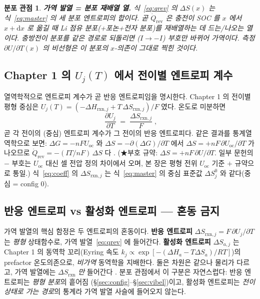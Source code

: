\documentclass[11pt,a4paper]{article}
\newtheorem*{distbox}{분포 관점}
\newcommand{\dd}{\mathrm{d}}
\newcommand{\rxn}{\mathrm{rxn}}
\newcommand{\rev}{\mathrm{rev}}
\newcommand{\oc}{\mathrm{oc}}
\begin{document}
\begin{distbox}
\textbf{가역 발열 = 분포 재배열 열.} 식~\eqref{eq:qrev} 의 $\Delta S(x)$ 는 식~\eqref{eq:master} 의
세 분포 엔트로피의 합이다. 곧 $\dot Q_\rev$ 은 충전이 SOC 를 $x$ 에서 $x+\dd x$ 로 옮길 때 Li 점유
분포(+포논+전자 분포)를 \emph{재배열하는 데 드는/나오는 열}이다. 충방전이 분포를 같은 경로로 되돌리면
($I\to-I$) 부호만 바뀌어 \emph{가역}이다. 측정 $\partial U/\partial T(x)$ 의 비선형은 이 분포의
$x$-의존이 그대로 찍힌 것이다.
\end{distbox}

\subsection{Chapter 1 의 $U_j(T)$ 에서 전이별 엔트로피 계수}
열역학적으로 엔트로피 계수가 곧 반응 엔트로피임을 명시한다. Chapter 1 의 전이별 평형 중심은
$U_j(T)=(-\Delta H_{\rxn,j}+T\,\Delta S_{\rxn,j})/F$ 였다. 온도로 미분하면
\begin{equation}
\boxed{\;\frac{\partial U_j}{\partial T}\;=\;\frac{\Delta S_{\rxn,j}}{F}\;,}
\label{eq:coeff}
\end{equation}
곧 각 전이의 (중심) 엔트로피 계수가 그 전이의 반응 엔트로피다. 같은 결과를 통계열역학으로 보면:
$\Delta G=-nF U_\oc$ 와 $\Delta S=-\partial(\Delta G)/\partial T$ 에서 $\Delta S=+nF\,\partial U_\oc/\partial T$
가 나오므로 $\dot Q_\rev=-(IT/nF)\,\Delta S$ 다 \cite{newman,msmr_partI}. (★부호 규약:
$\Delta S=+nF\,\partial U/\partial T$. 일부 문헌의 $-$ 부호는 $U_\oc$ 대신 셀 전압 정의 차이에서 오며,
본 장은 평형 전위 $U_\oc$ 기준 $+$ 규약으로 통일.) 식~\eqref{eq:coeff} 의 $\Delta S_{\rxn,j}$ 는
식~\eqref{eq:master} 의 중심 표준값 $\Delta S^0_j$ 와 같다(중심 = config 0).

\subsection{반응 엔트로피 vs 활성화 엔트로피 — 혼동 금지}\label{sub:caveat}
가역 발열의 핵심 함정은 두 엔트로피의 혼동이다. \textbf{반응 엔트로피}
$\Delta S_{\rxn,j}=F\,\partial U_j/\partial T$ 는 \emph{평형} 상태함수로, 가역 발열~\eqref{eq:qrev} 에
들어간다. \textbf{활성화 엔트로피} $\Delta S_{a,j}$ 는 Chapter 1 의 동역학 꼬리(Eyring 속도
$k_j\propto\exp[-(\Delta H_a-T\Delta S_a)/RT]$)의 prefactor 온도의존으로, \emph{비가역} 동역학을
지배한다. 둘은 차원은 같으나 물리가 다르고, 가역 발열에는 $\Delta S_{\rxn}$ \emph{만} 들어간다
\cite{msmr_partI}. 분포 관점에서 이 구분은 자연스럽다: 반응 엔트로피는 \emph{평형 분포}의 흩어짐
(\S\ref{sec:config}--\S\ref{sec:vibel})이고, 활성화 엔트로피는 \emph{전이상태로 가는 경로}의 통계라
가역 발열 사슬에 들어오지 않는다.
\end{document}
